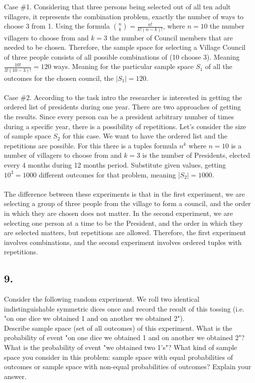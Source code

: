 \documentclass[a4paper]{article}
\begin{document}
Case \#1. Considering that three persons being selected out of all ten adult villagers, it represents the combination problem, exactly the number of ways to choose 3 from 1. Using the formula \(\binom{n}{k} = \frac{n!}{k!(n-k)!}\), where \(n = 10\) the number villagers to choose from and \(k = 3\) the number of Council members that are needed to be chosen. Therefore, the sample space for selecting a Village Council of three people consists of all possible combinations of (10 choose 3). Meaning \(\frac{10!}{3!(10-3)!} = 120\) ways. Meaning for the particular sample space \(S_1\) of all the outcomes for the chosen council, the \(|S_1| = 120\).\\
\\Case \#2. According to the task intro the researcher is interested in getting the ordered list of presidents during one year. There are two approaches of getting the results. Since every person can be a president arbitrary number of times during a specific year, there is a possibility of repetitions. Let's consider the size of sample space \(S_2\) for this case. We want to have the ordered list and the repetitions are possible. For this there is a tuples formula \(n^k\) where \(n = 10\) is a number of villagers to choose from and \(k = 3\) is the number of Presidents, elected every 4 months during 12 months period. Substitute given values, getting \(10^3 = 1000\) different outcomes for that problem, meaning \(|S_2| = 1000.\) \\ \\
The difference between these experiments is that in the first experiment, we are selecting a group of three people from the village to form a council, and the order in which they are chosen does not matter. In the second experiment, we are selecting one person at a time to be the President, and the order in which they are selected matters, but repetitions are allowed. Therefore, the first experiment involves combinations, and the second experiment involves ordered tuples with repetitions.

\subsection*{9.}
Consider the following random experiment. We roll two identical indistinguishable symmetric dices once and record the result of this tossing (i.e. "on one dice we obtained 1 and on another we obtained 2"). \\

Describe sample space (set of all outcomes) of this experiment. What is the probability of event "on one dice we obtained 1 and on another we obtained 2"? What is the probability of event "we obtained two 1's"? What kind of sample space you consider in this problem: sample space with equal probabilities of outcomes or sample space with non-equal probabilities of outcomes? Explain your answer.
\end{document}
